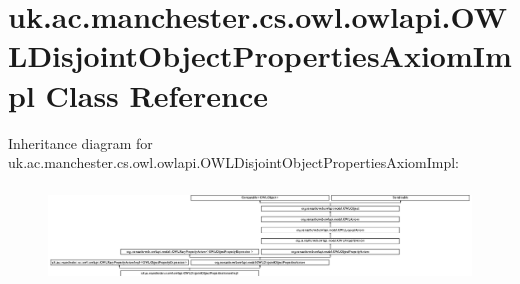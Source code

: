 \hypertarget{classuk_1_1ac_1_1manchester_1_1cs_1_1owl_1_1owlapi_1_1_o_w_l_disjoint_object_properties_axiom_impl}{\section{uk.\-ac.\-manchester.\-cs.\-owl.\-owlapi.\-O\-W\-L\-Disjoint\-Object\-Properties\-Axiom\-Impl Class Reference}
\label{classuk_1_1ac_1_1manchester_1_1cs_1_1owl_1_1owlapi_1_1_o_w_l_disjoint_object_properties_axiom_impl}
}
Inheritance diagram for uk.\-ac.\-manchester.\-cs.\-owl.\-owlapi.\-O\-W\-L\-Disjoint\-Object\-Properties\-Axiom\-Impl\-:\begin{figure}[H]
\begin{center}
\leavevmode
\includegraphics[height=2.588099cm]{classuk_1_1ac_1_1manchester_1_1cs_1_1owl_1_1owlapi_1_1_o_w_l_disjoint_object_properties_axiom_impl}
\end{center}
\end{figure}
